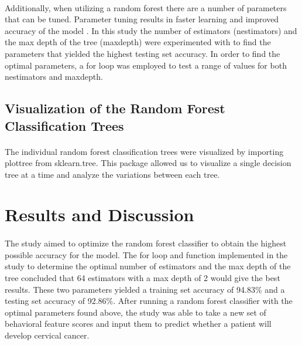 \documentclass[10pt, oneside, twocolumn]{article}
\begin{document}
\paragraph{}
Additionally, when utilizing a random forest there are a number of parameters that can be tuned. Parameter tuning results in faster learning and improved accuracy of the model \cite{Salod}. In this study the number of estimators (n\textunderscore estimators) and the max depth of the tree (max\textunderscore depth) were experimented with to find the parameters that yielded the highest testing set accuracy. In order to find the optimal parameters, a for loop was employed to test a range of values for both n\textunderscore estimators and max\textunderscore depth. 
\subsection{Visualization of the Random Forest Classification Trees}
\paragraph{}
The individual random forest classification trees were visualized by importing plot\textunderscore tree from sklearn.tree. This package allowed us to visualize a single decision tree at a time and analyze the variations between each tree.

\section{Results and Discussion}
\paragraph{}
The study aimed to optimize the random forest classifier to obtain the highest possible accuracy for the model. The for loop and function implemented in the study to determine the optimal number of estimators and the max depth of the tree concluded that 64 estimators with a max depth of 2 would give the best results. These two parameters yielded a training set accuracy of 94.83\% and a testing set accuracy of 92.86\%. After running a random forest classifier with the optimal parameters found above, the study was able to take a new set of behavioral feature scores and input them to predict whether a patient will develop cervical cancer. 
\end{document}
